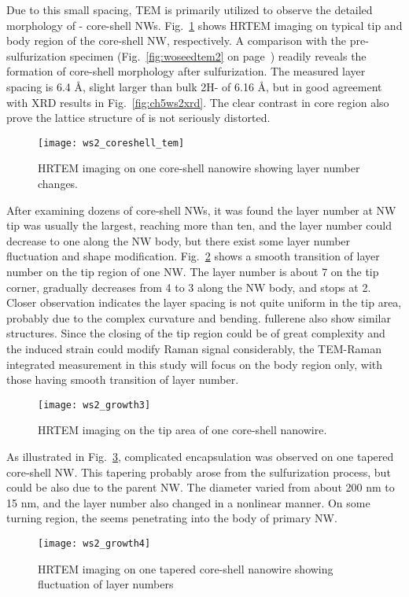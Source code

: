 Due to this small spacing, TEM is primarily utilized to observe the detailed morphology of - core-shell NWs. Fig.~\ref{fig:ch5ws2tem1} shows HRTEM imaging on typical tip and body region of the core-shell NW, respectively. A comparison with the pre-sulfurization specimen (Fig.~\ref{fig:woseedtem2} on page~\pageref{fig:woseedtem2}) readily reveals the formation of core-shell morphology after sulfurization. The measured layer spacing is 6.4 \si{\angstrom}, slight larger than bulk 2H- of 6.16 \si{\angstrom}, but in good agreement with XRD results in Fig.~\ref{fig:ch5ws2xrd}. The clear contrast in core region also prove the lattice structure of  is not seriously distorted.
\begin{figure}[htb]
\centering
\texttt{[image: ws2\_coreshell\_tem]}
\caption{HRTEM imaging on one core-shell nanowire showing layer number changes.}
\label{fig:ch5ws2tem1}
\end{figure}
After examining dozens of core-shell NWs, it was found the  layer number at NW tip was usually the largest, reaching more than ten, and the layer number could decrease to one along the NW body, but there exist some layer number fluctuation and shape modification. Fig.~\ref{fig:ch5ws2tem3} shows a smooth transition of  layer number on the tip region of one NW. The layer number is about 7 on the tip corner, gradually decreases from 4 to 3 along the NW body, and stops at 2. Closer observation indicates the layer spacing is not quite uniform in the tip area, probably due to the complex curvature and bending.  fullerene also show similar structures. Since the closing of the tip region could be of great complexity and the induced strain could modify Raman signal considerably, the TEM-Raman integrated measurement in this study will focus on the body region only, with those having smooth transition of layer number.
\begin{figure}[htb]
\centering
\texttt{[image: ws2\_growth3]}
\caption{HRTEM imaging on the tip area of one core-shell nanowire.}
\label{fig:ch5ws2tem3}
\end{figure}
As illustrated in Fig.~\ref{fig:ch5ws2tem4}, complicated  encapsulation was observed on one tapered core-shell NW. This tapering probably arose from the sulfurization process, but could be also due to the parent  NW. The diameter varied from about 200 nm to 15 nm, and the  layer number also changed in a nonlinear manner. On some turning region, the  seems penetrating into the body of primary  NW. 
\begin{figure}[htb]
\centering
\texttt{[image: ws2\_growth4]}
\caption{HRTEM imaging on one tapered core-shell nanowire showing fluctuation of layer numbers}
\label{fig:ch5ws2tem4}
\end{figure}

